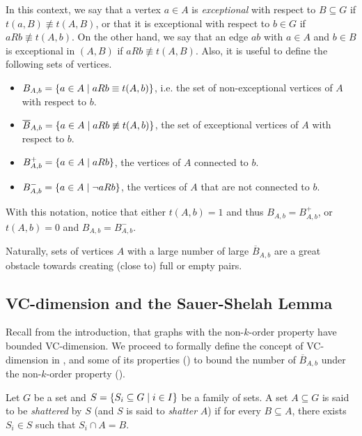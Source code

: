        In this context, we say that a vertex $a \in A$ is \emph{exceptional} with respect to $B \subseteq G$ if $t(a,B) \not\equiv t(A,B)$,
        or that it is exceptional with respect to $b \in G$ if $a R b \not\equiv t(A,b)$.
        On the other hand, we say that an edge $ab$ with $a \in A$ and $b \in B$ is exceptional in $(A,B)$ if $a R b \not\equiv t(A,B)$.
        Also, it is useful to define the following sets of vertices.
        \begin{itemize}
            \item $B_{A,b} = \{ a \in A \mid a R b \equiv t(A,b) \}$, i.e. the set of non-exceptional vertices of $A$
                with respect to $b$.
            \item $\overline{B}_{A,b} = \{ a \in A \mid a R b \not\equiv t(A,b) \}$, the set of exceptional vertices of $A$ with
                respect to $b$.
            \item $B^+_{A,b} = \{ a \in A \mid a R b \}$, the vertices of $A$ connected to $b$.
            \item $B^-_{A,b} = \{ a \in A \mid \neg a R b \}$, the vertices of $A$ that are not connected to $b$.
        \end{itemize}
        With this notation, notice that either $t(A,b) = 1$ and thus $B_{A,b} = B^+_{A,b}$, or $t(A,b) = 0$ and $B_{A,b} = B^-_{A,b}$.

        Naturally, sets of vertices $A$ with a large number of large $\overline{B}_{A,b}$ are a great obstacle towards
        creating (close to) full or empty pairs.

    \subsection{VC-dimension and the Sauer-Shelah Lemma} \label{subsec:subsection_3.2}

        Recall from the introduction, that graphs with the non-$k$-order property have bounded VC-dimension.
        We proceed to formally define the concept of VC-dimension in , and some of its properties
        () to bound the number of $\overline{B}_{A,b}$
        under the non-$k$-order property ().

        \begin{definition} \label{def:shattered}
            Let $G$ be a set and $S = \{ S_i \subseteq G \mid i \in I \}$ be a family of sets.
            A set $A \subseteq G$ is said to be \emph{shattered} by $S$ (and $S$ is said to \emph{shatter} $A$) if
            for every $B \subseteq A$, there exists $S_i \in S$ such that $S_i \cap A = B$.
        \end{definition}

